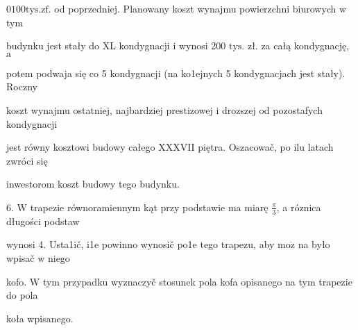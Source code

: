 \documentclass[a4paper,12pt]{article}
\begin{document}
$0100\mathrm{t}\mathrm{y}\mathrm{s}. \mathrm{z}\mathrm{f}$. od poprzedniej. Planowany koszt wynajmu powierzchni biurowych $\mathrm{w}$ tym

budynku jest stały do XL kondygnacji $\mathrm{i}$ wynosi 200 $\mathrm{t}\mathrm{y}\mathrm{s}$. zł. za całą kondygnację, $\mathrm{a}$

potem podwaja się co 5 kondygnacji (na ko1ejnych 5 kondygnacjach jest stały). Roczny

koszt wynajmu ostatniej, najbardziej prestizowej $\mathrm{i}$ drozszej od pozostafych kondygnacji

jest równy kosztowi budowy całego XXXVII piętra. Oszacowač, po ilu latach zwróci się

inwestorom koszt budowy tego budynku.

6. $\mathrm{W}$ trapezie równoramiennym kąt przy podstawie ma miarę $\displaystyle \frac{\pi}{3}$, a róznica długości podstaw

wynosi 4. Usta1ič, i1e powinno wynosič po1e tego trapezu, aby $\mathrm{m}\mathrm{o}\dot{\mathrm{z}}$ na było wpisač $\mathrm{w}$ niego

kofo. $\mathrm{W}$ tym przypadku wyznaczyč stosunek pola kofa opisanego na tym trapezie do pola

koła wpisanego.
\end{document}
